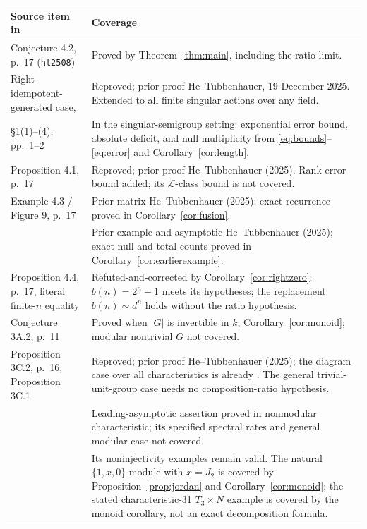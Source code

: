 \documentclass[11pt]{article}
\begin{document}
\begin{center}\small
\begin{tabularx}{\textwidth}{@{}>{\raggedright\arraybackslash}p{}>{\raggedright\arraybackslash}X@{}}
\toprule Source item in \cite{HT25} & Coverage \\ \midrule
Conjecture 4.2, p.~17 (\texttt{ht2508}) & Proved by Theorem~\ref{thm:main}, including the ratio limit. \\
Right-idempotent-generated case, \cite[Theorem 4A.14(e)--(f)]{HT26} & Reproved; prior proof He--Tubbenhauer, 19 December 2025. Extended to all finite singular actions over any field. \\
\S1(1)--(4), pp.~1--2 & In the singular-semigroup setting: exponential error bound, absolute deficit, and null multiplicity from \eqref{eq:bounds}--\eqref{eq:error} and Corollary~\ref{cor:length}. \\
Proposition 4.1, p.~17 & Reproved; prior proof He--Tubbenhauer (2025). Rank error bound added; its \(\mathcal L\)-class bound is not covered. \\
Example 4.3 / Figure 9, p.~17 & Prior matrix He--Tubbenhauer (2025); exact recurrence proved in Corollary~\ref{cor:fusion}. \\
\cite[v1, Example 2.2; v2, Example 1, p.~3]{HTgrowth} & Prior example and asymptotic He--Tubbenhauer (2025); exact null and total counts proved in Corollary~\ref{cor:earlierexample}. \\
Proposition 4.4, p.~17, literal finite-\(n\) equality & Refuted-and-corrected by Corollary~\ref{cor:rightzero}: \(b(n)=2^n-1\) meets its hypotheses; the replacement \(b(n)\sim d^n\) holds without the ratio hypothesis. \\
Conjecture 3A.2, p.~11 & Proved when \(|G|\) is invertible in \(k\), Corollary~\ref{cor:monoid}; modular nontrivial \(G\) not covered. \\
Proposition 3C.2, p.~16; Proposition 3C.1 & Reproved; prior proof He--Tubbenhauer (2025); the diagram case over all characteristics is already \cite[Example~4A.13(b)]{HT26}. The general trivial-unit-group case needs no composition-ratio hypothesis. \\
\cite[v1, Conjecture 1B.1(1); v2, Conjecture 1(1), p.~2]{HTgrowth} & Leading-asymptotic assertion proved in nonmodular characteristic; its specified spectral rates and general modular case not covered. \\
\cite[v1, \S4C, p.~8; v2, \S4.3]{HTgrowth} & Its noninjectivity examples remain valid. The natural \(\{1,x,0\}\) module with \(x=J_2\) is covered by Proposition~\ref{prop:jordan} and Corollary~\ref{cor:monoid}; the stated characteristic-31 \(T_3\times N\) example is covered by the monoid corollary, not an exact decomposition formula. \\

\end{tabularx}
\end{center}
\end{document}
